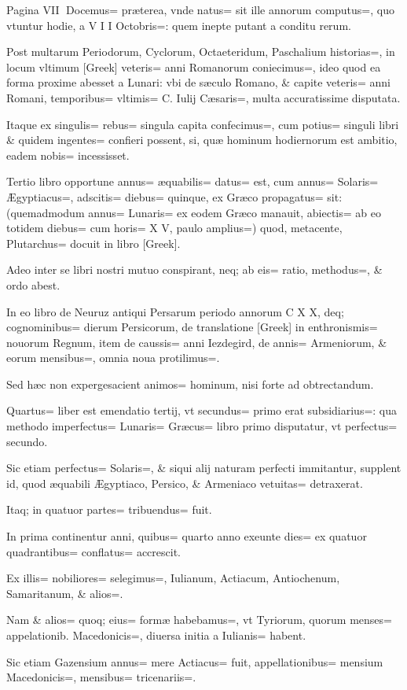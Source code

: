 \begin{parnumbers}
Pagina VII
Docemus= præterea, vnde natus= sit ille annorum computus=, quo vtuntur hodie, a V I I Octobris=: quem inepte putant a conditu rerum.

Post multarum Periodorum, Cyclorum, Octaeteridum, Paschalium historias=, in locum vltimum [Greek] veteris= anni Romanorum coniecimus=, ideo quod ea forma proxime abesset a Lunari: vbi de sæculo Romano, \& capite veteris= anni Romani, temporibus= vltimis= C. Iulij Cæsaris=, multa accuratissime disputata.

Itaque ex singulis= rebus= singula capita confecimus=, cum potius= singuli libri \& quidem ingentes= confieri possent, si, quæ hominum hodiernorum est ambitio, eadem nobis= incessisset.

Tertio libro opportune annus= æquabilis= datus= est, cum annus= Solaris= Ægyptiacus=, adscitis= diebus= quinque, ex Græco propagatus= sit: (quemadmodum annus= Lunaris= ex eodem Græco manauit, abiectis= ab eo totidem diebus= cum horis= X V, paulo amplius=) quod, metacente, Plutarchus= docuit in libro [Greek].

Adeo inter se libri nostri mutuo conspirant, neq; ab eis= ratio, methodus=, \& ordo abest.

In eo libro de Neuruz antiqui Persarum periodo annorum C X X, deq; cognominibus= dierum Persicorum, de translatione [Greek] in enthronismis= nouorum Regnum, item de caussis= anni Iezdegird, de annis= Armeniorum, \& eorum mensibus=, omnia noua protilimus=. 

Sed hæc non expergesacient animos= hominum, nisi forte ad obtrectandum.

Quartus= liber est emendatio tertij, vt secundus= primo erat subsidiarius=: qua methodo imperfectus= Lunaris= Græcus= libro primo disputatur, vt perfectus= secundo.

Sic etiam perfectus= Solaris=, \& siqui alij naturam perfecti immitantur, supplent id, quod æquabili Ægyptiaco, Persico, \& Armeniaco vetuitas= detraxerat.

Itaq; in quatuor partes= tribuendus= fuit.

In prima continentur anni, quibus= quarto anno exeunte dies= ex quatuor quadrantibus= conflatus= accrescit.

Ex illis= nobiliores= selegimus=, Iulianum, Actiacum, Antiochenum, Samaritanum, \& alios=. 

Nam \& alios= quoq; eius= formæ habebamus=, vt Tyriorum, quorum menses= appelationib. Macedonicis=, diuersa initia a Iulianis= habent.

Sic etiam Gazensium annus= mere Actiacus= fuit, appellationibus= mensium Macedonicis=, mensibus= tricenariis=. 


\end{parnumbers}
